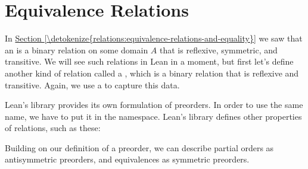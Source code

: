 \documentclass[letterpaper,10pt,english]{sphinxmanual}
\begin{document}
\section{Equivalence Relations}
\label{\detokenize{relations_in_lean:equivalence-relations}}
\sphinxAtStartPar
In \hyperref[\detokenize{relations:equivalence-relations-and-equality}]{Section \ref{\detokenize{relations:equivalence-relations-and-equality}}} we saw that an  is a binary relation on some domain \(A\) that is reflexive, symmetric, and transitive. We will see such relations in Lean in a moment, but first let’s define another kind of relation called a , which is a binary relation that is reflexive and transitive.
Again, we use a  to capture this data.

\begin{sphinxVerbatim}[commandchars=\\\{\}]
 

 

   

      
        
     
     

 
\end{sphinxVerbatim}

\sphinxAtStartPar
Lean’s library provides its own formulation of preorders.
In order to use the same name, we have to put it in the  namespace.
Lean’s library defines other properties of relations, such as these:

\sphinxAtStartPar
Building on our definition of a preorder,
we can describe partial orders as antisymmetric preorders,
and equivalences as symmetric preorders.
\end{document}
